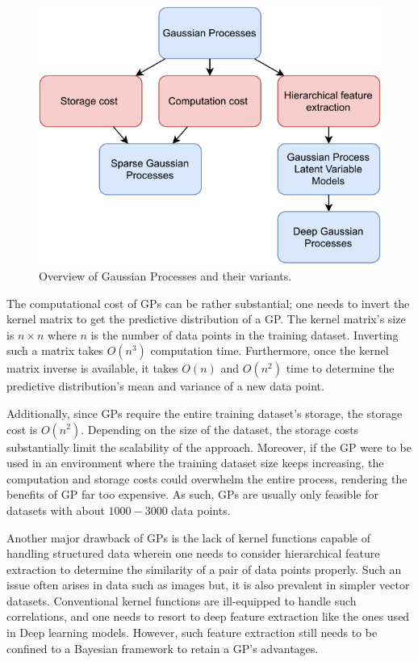 \documentclass[letterpaper,11pt]{extarticle}
\begin{document}
\begin{figure}[htp]
    \centering
    \includegraphics[width=0.6\linewidth]{figs/GP.pdf}
    \caption{Overview of Gaussian Processes and their variants.}
    \label{fig:overview}
\end{figure}

The computational cost of GPs can be rather substantial; one needs to invert the kernel matrix to get the predictive distribution of a GP. The kernel matrix's size is $n \times n$ where $n$ is the number of data points in the training dataset. Inverting such a matrix takes $O(n^3)$ computation time. Furthermore, once the kernel matrix inverse is available, it takes $O(n)$ and $O(n^2)$ time to determine the predictive distribution's mean and variance of a new data point.

Additionally, since GPs require the entire training dataset's storage, the storage cost is $O(n^2)$. Depending on the size of the dataset, the storage costs substantially limit the scalability of the approach. Moreover, if the GP were to be used in an environment where the training dataset size keeps increasing, the computation and storage costs could overwhelm the entire process, rendering the benefits of GP far too expensive. As such, GPs are usually only feasible for datasets with about $1000-3000$ data points.

Another major drawback of GPs is the lack of kernel functions capable of handling structured data wherein one needs to consider hierarchical feature extraction to determine the similarity of a pair of data points properly. Such an issue often arises in data such as images but, it is also prevalent in simpler vector datasets. Conventional kernel functions are ill-equipped to handle such correlations, and one needs to resort to deep feature extraction like the ones used in Deep learning models. However, such feature extraction still needs to be confined to a Bayesian framework to retain a GP's advantages.
\end{document}
